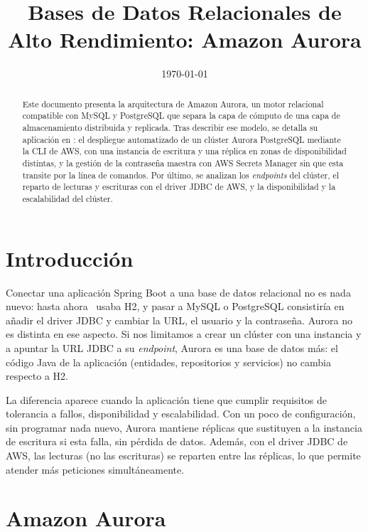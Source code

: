 \documentclass[12pt,a4paper]{article}
\title{Bases de Datos Relacionales de Alto Rendimiento: Amazon Aurora}
\date{\normalsize\today}
\begin{document}
\maketitle

\begin{abstract}
Este documento presenta la arquitectura de Amazon Aurora, un motor relacional
compatible con MySQL y PostgreSQL que separa la capa de cómputo de una capa de
almacenamiento distribuida y replicada. Tras describir ese modelo, se detalla su
aplicación en \proyecto: el despliegue automatizado de un clúster Aurora
PostgreSQL mediante la CLI de AWS, con una instancia de escritura y una réplica
en zonas de disponibilidad distintas, y la gestión de la contraseña maestra con
AWS Secrets Manager sin que esta transite por la línea de comandos. Por último,
se analizan los \textit{endpoints} del clúster, el reparto de lecturas y
escrituras con el driver JDBC de AWS, y la disponibilidad y la escalabilidad del
clúster.
\end{abstract}

{
\let\clearpage\relax
\tableofcontents
}

\section{Introducción}

Conectar una aplicación Spring Boot a una base de datos relacional no es nada nuevo: hasta ahora \proyecto~usaba H2, y pasar a MySQL o PostgreSQL consistiría en añadir el driver JDBC y cambiar la URL, el usuario y la contraseña. Aurora no es distinta en ese aspecto. Si nos limitamos a crear un clúster con una instancia y a apuntar la URL JDBC a su \textit{endpoint}, Aurora es una base de datos más: el código Java de la aplicación (entidades, repositorios y servicios) no cambia respecto a H2.

La diferencia aparece cuando la aplicación tiene que cumplir requisitos de tolerancia a fallos, disponibilidad y escalabilidad. Con un poco de configuración, sin programar nada nuevo, Aurora mantiene réplicas que sustituyen a la instancia de escritura si esta falla, sin pérdida de datos. Además, con el driver JDBC de AWS, las lecturas (no las escrituras) se reparten entre las réplicas, lo que permite atender más peticiones simultáneamente.

\section{Amazon Aurora}\label{sec:aurora}
\end{document}
